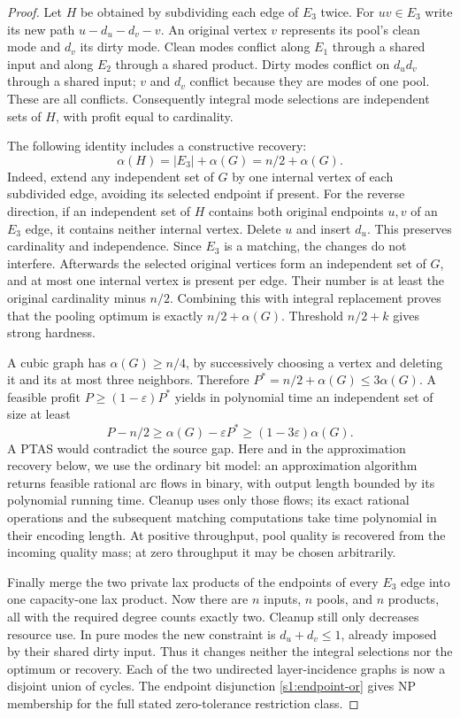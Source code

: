 \begin{proof}
Let $H$ be obtained by subdividing each edge of $E_3$ twice. For
$uv\in E_3$ write its new path $u-d_u-d_v-v$. An original vertex $v$
represents its pool's clean mode and $d_v$ its dirty mode. Clean modes
conflict along $E_1$ through a shared input and along $E_2$ through a
shared product. Dirty modes conflict on $d_ud_v$ through a shared input;
$v$ and $d_v$ conflict because they are modes of one pool. These are
all conflicts. Consequently integral mode selections are independent
sets of $H$, with profit equal to cardinality.

The following identity includes a constructive recovery:
\begin{equation}
 \alpha(H)=|E_3|+\alpha(G)=n/2+\alpha(G).\label{s3:is-identity}
\end{equation}
Indeed, extend any independent set of $G$ by one internal vertex of
each subdivided edge, avoiding its selected endpoint if present. For
the reverse direction, if an independent set of $H$ contains both
original endpoints $u,v$ of an $E_3$ edge, it contains neither internal
vertex. Delete $u$ and insert $d_u$. This preserves cardinality and
independence. Since $E_3$ is a matching, the changes do not interfere.
Afterwards the selected original vertices form an independent set of
$G$, and at most one internal vertex is present per edge. Their number
is at least the original cardinality minus $n/2$. Combining this with
integral replacement proves that the pooling optimum is exactly
$n/2+\alpha(G)$. Threshold $n/2+k$ gives strong hardness.

A cubic graph has $\alpha(G)\ge n/4$, by successively choosing a vertex
and deleting it and its at most three neighbors. Therefore
$P^*=n/2+\alpha(G)\le3\alpha(G)$. A feasible profit
$P\ge(1-\varepsilon)P^*$ yields in polynomial time an independent set
of size at least
\begin{equation}
 P-n/2\ge\alpha(G)-\varepsilon P^*
 \ge(1-3\varepsilon)\alpha(G).\label{s3:gap-transfer}
\end{equation}
A PTAS would contradict the source gap. Here and in the approximation
recovery below, we use the ordinary bit model: an approximation algorithm
returns feasible rational arc flows in binary, with output length bounded
by its polynomial running time. Cleanup uses only those flows; its exact
rational operations and the subsequent matching computations take time
polynomial in their encoding length. At positive throughput, pool quality
is recovered from the incoming quality mass; at zero throughput it may
be chosen arbitrarily.

Finally merge the two private lax products of the endpoints of every
$E_3$ edge into one capacity-one lax product. Now there are $n$ inputs,
$n$ pools, and $n$ products, all with the required degree counts exactly
two. Cleanup still only decreases resource use. In pure modes the new
constraint is $d_u+d_v\le1$, already imposed by their shared dirty input.
Thus it changes neither the integral selections nor the optimum or
recovery. Each of the two undirected layer-incidence graphs is now a
disjoint union of cycles. The endpoint disjunction
\eqref{s1:endpoint-or} gives NP membership for the full stated
zero-tolerance restriction class.
\end{proof}

